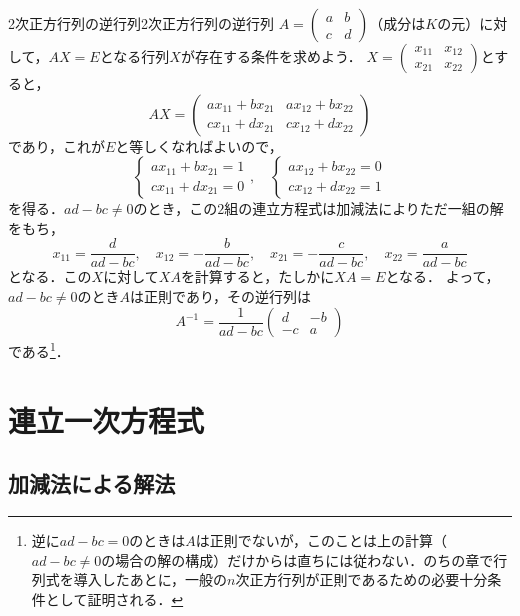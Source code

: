 \begin{example}{2次正方行列の逆行列}{2次正方行列の逆行列}
  $A = \begin{pmatrix} a & b \\ c & d \end{pmatrix}$（成分は$K$の元）に対して，$AX = E$となる行列$X$が存在する条件を求めよう．
  $X = \begin{pmatrix} x_{11} & x_{12} \\ x_{21} & x_{22} \end{pmatrix}$とすると，
  \[
    AX =
    \begin{pmatrix}
      ax_{11} + bx_{21} & ax_{12} + bx_{22} \\
      cx_{11} + dx_{21} & cx_{12} + dx_{22}
    \end{pmatrix}
  \]
  であり，これが$E$と等しくなればよいので，
  \[
    \begin{cases}
      ax_{11} + bx_{21} = 1 \\
      cx_{11} + dx_{21} = 0
    \end{cases}, \quad
    \begin{cases}
      ax_{12} + bx_{22} = 0 \\
      cx_{12} + dx_{22} = 1
    \end{cases}
  \]
  を得る．$ad - bc \ne 0$のとき，この$2$組の連立方程式は加減法によりただ一組の解をもち，
  \[
    x_{11} = \frac{d}{ad - bc}, \quad
    x_{12} = -\frac{b}{ad - bc}, \quad
    x_{21} = -\frac{c}{ad - bc}, \quad
    x_{22} = \frac{a}{ad - bc}
  \]
  となる．この$X$に対して$XA$を計算すると，たしかに$XA = E$となる．
  よって，$ad - bc \ne 0$のとき$A$は正則であり，その逆行列は
  \[
    A^{-1} = \frac{1}{ad - bc} \begin{pmatrix} d & -b \\ -c & a \end{pmatrix}
  \]
  である\footnote{逆に$ad - bc = 0$のときは$A$は正則でないが，このことは上の計算（$ad - bc \ne 0$の場合の解の構成）だけからは直ちには従わない．のちの章で行列式を導入したあとに，一般の$n$次正方行列が正則であるための必要十分条件として証明される．}．
\end{example}

\section{連立一次方程式}

\subsection{加減法による解法}

